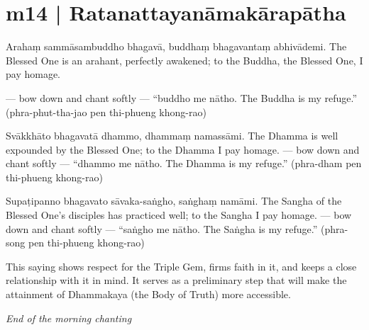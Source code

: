 \section*{m14 | Ratanattayanāmakārapātha}

\begin{chantsubsection}
  \chantnote
    {Arahaṃ sammāsambuddho bhagavā, buddhaṃ bhagavantaṃ abhivādemi.}
  \chantnotetrans
    {The Blessed One is an arahant, perfectly awakened; to the Buddha, the Blessed One, I pay homage.}
  \chantgap
  
  \chantnote
    {--- bow down and chant softly ---}
  \chantnote
    {“buddho me nātho.}
  \chantnote
    {The Buddha is my refuge.”}
  \chantindent
    {(phra-phut-tha-jao pen thi-phueng khong-rao)}
  \chantgap
  \chantgap

  \chantnote
    {Svākkhāto bhagavatā dhammo, dhammaṃ namassāmi.}
  \chantnotetrans
    {The Dhamma is well expounded by the Blessed One; to the Dhamma I pay homage.}
  \chantnote
    {--- bow down and chant softly ---}
  \chantnote
    {“dhammo me nātho.}
  \chantnote
    {The Dhamma is my refuge.”}
  \chantindent
    {(phra-dham pen thi-phueng khong-rao)}
  \chantgap
  \chantgap
  
  \chantnote
    {Supaṭipanno bhagavato sāvaka-saṅgho, saṅghaṃ namāmi.}
  \chantnotetrans
    {The Sangha of the Blessed One's disciples has practiced well; to the Sangha I pay homage.}
  \chantnote
    {--- bow down and chant softly ---}
  \chantnote
    {“saṅgho me nātho.}
  \chantnote
    {The Saṅgha is my refuge.”}
  \chantindent
    {(phra-song pen thi-phueng khong-rao)}
\end{chantsubsection}

\chantgap
\chantgap
{\englishstyle
This saying shows respect for the Triple Gem, firms faith in it, and keeps a close relationship with it in mind. It serves as a preliminary step that will make the attainment of Dhammakaya (the Body of Truth) more accessible.}

\chantgap
\chantgap
{\englishstyle\textit{End of the morning chanting}
}
